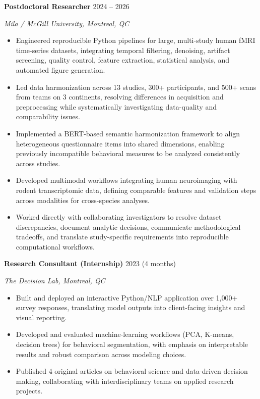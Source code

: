 \documentclass[letterpaper,10pt]{article}
\newcommand{\role}[3]{\textbf{#1} \hfill #3\par\textit{#2}\par}
\begin{document}
\role{Postdoctoral Researcher}{Mila / McGill University, Montreal, QC}{2024 -- 2026}
\begin{itemize}
    \item Engineered reproducible Python pipelines for large, multi-study human fMRI time-series datasets, integrating temporal filtering, denoising, artifact screening, quality control, feature extraction, statistical analysis, and automated figure generation.
    \item Led data harmonization across 13 studies, 300+ participants, and 500+ scans from teams on 3 continents, resolving differences in acquisition and preprocessing while systematically investigating data-quality and comparability issues.
    \item Implemented a BERT-based semantic harmonization framework to align heterogeneous questionnaire items into shared dimensions, enabling previously incompatible behavioral measures to be analyzed consistently across studies.
    \item Developed multimodal workflows integrating human neuroimaging with rodent transcriptomic data, defining comparable features and validation steps across modalities for cross-species analyses.
    \item Worked directly with collaborating investigators to resolve dataset discrepancies, document analytic decisions, communicate methodological tradeoffs, and translate study-specific requirements into reproducible computational workflows.
\end{itemize}
\vspace{3pt}

\role{Research Consultant (Internship)}{The Decision Lab, Montreal, QC}{2023 (4 months)}
\begin{itemize}
    \item Built and deployed an interactive Python/NLP application over 1,000+ survey responses, translating model outputs into client-facing insights and visual reporting.
    \item Developed and evaluated machine-learning workflows (PCA, K-means, decision trees) for behavioral segmentation, with emphasis on interpretable results and robust comparison across modeling choices.
    \item Published 4 original articles on behavioral science and data-driven decision making, collaborating with interdisciplinary teams on applied research projects.
\end{itemize}
\vspace{3pt}
\end{document}

